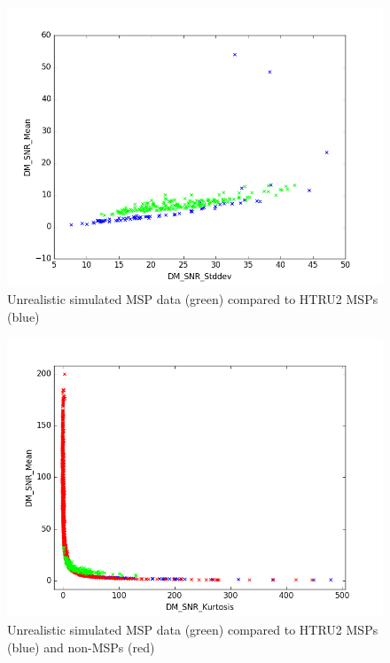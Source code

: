 \documentclass[12pt]{article}
\begin{document}
\begin{figure}[h!]
\begin{center}
\includegraphics[scale=0.5]{htru2_msp(b)_sim_r3(g)_dm_mean_vs_stddev.png}
\caption{Unrealistic simulated MSP data (green) compared to HTRU2 MSPs (blue)}
\label{DMMeanStddevBadvsMSP}
\end{center}
\end{figure}

\begin{figure}[h!]
\begin{center}
\includegraphics[scale=0.5]{htru2_msp(b)_non_msp(r)_sim_r3(g)_dm_mean_vs_skew.png}
\caption{Unrealistic simulated MSP data (green) compared to HTRU2 MSPs (blue) and non-MSPs (red)}
\label{DMMeanSkewBadvsMSPvsNon}
\end{center}
\end{figure}
\end{document}
